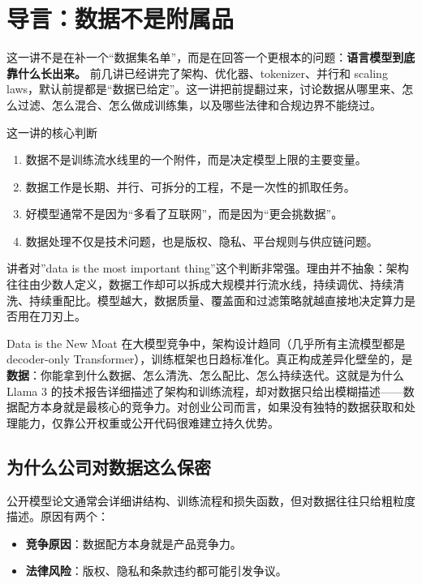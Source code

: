 \section{导言：数据不是附属品}

这一讲不是在补一个“数据集名单”，而是在回答一个更根本的问题：\textbf{语言模型到底靠什么长出来。} 前几讲已经讲完了架构、优化器、tokenizer、并行和 scaling laws，默认前提都是“数据已给定”。这一讲把前提翻过来，讨论数据从哪里来、怎么过滤、怎么混合、怎么做成训练集，以及哪些法律和合规边界不能绕过。

\begin{importantbox}{这一讲的核心判断}
\begin{enumerate}
    \item 数据不是训练流水线里的一个附件，而是决定模型上限的主要变量。
    \item 数据工作是长期、并行、可拆分的工程，不是一次性的抓取任务。
    \item 好模型通常不是因为“多看了互联网”，而是因为“更会挑数据”。
    \item 数据处理不仅是技术问题，也是版权、隐私、平台规则与供应链问题。
\end{enumerate}
\end{importantbox}

讲者对”data is the most important thing”这个判断非常强。理由并不抽象：架构往往由少数人定义，数据工作却可以拆成大规模并行流水线，持续调优、持续清洗、持续重配比。模型越大，数据质量、覆盖面和过滤策略就越直接地决定算力是否用在刀刃上。

\begin{importantbox}{Data is the New Moat}
在大模型竞争中，架构设计趋同（几乎所有主流模型都是 decoder-only Transformer），训练框架也日趋标准化。真正构成差异化壁垒的，是\textbf{数据}：你能拿到什么数据、怎么清洗、怎么配比、怎么持续迭代。这就是为什么 Llama 3 的技术报告详细描述了架构和训练流程，却对数据只给出模糊描述——数据配方本身就是最核心的竞争力。对创业公司而言，如果没有独特的数据获取和处理能力，仅靠公开权重或公开代码很难建立持久优势。
\end{importantbox}

\subsection{为什么公司对数据这么保密}

公开模型论文通常会详细讲结构、训练流程和损失函数，但对数据往往只给粗粒度描述。原因有两个：
\begin{itemize}
    \item \textbf{竞争原因}：数据配方本身就是产品竞争力。
    \item \textbf{法律风险}：版权、隐私和条款违约都可能引发争议。
\end{itemize}

